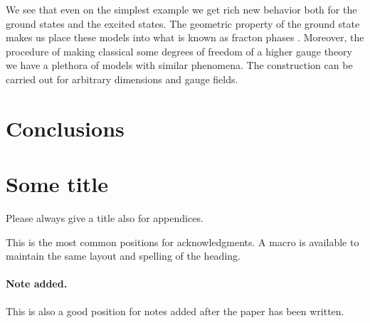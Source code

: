 \documentclass[a4paper,11pt]{article}
\theoremstyle{plain}%
\theoremstyle{definition}
\theoremstyle{remark}
\begin{document}
We see that even on the simplest example we get rich new behavior both for the ground states and the excited states. The geometric property of the ground state makes us place these models into what is known as fracton phases \cite{Chamon05,Nandkishore18}. Moreover, the procedure of making classical some degrees of freedom  of a higher gauge theory we have a plethora of models with similar phenomena. The construction can be carried out for arbitrary dimensions and gauge fields. 
\section{Conclusions}\label{sec:Remarks}


\appendix
\section{Some title}
Please always give a title also for appendices.





\acknowledgments

This is the most common positions for acknowledgments. A macro is
available to maintain the same layout and spelling of the heading.

\paragraph{Note added.} This is also a good position for notes added
after the paper has been written.






%
%
%





\end{document}
